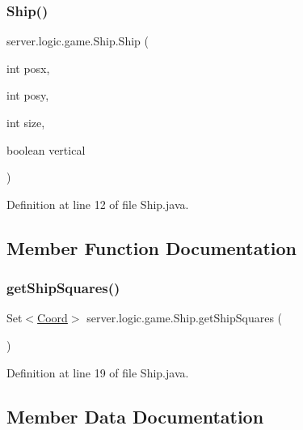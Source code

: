 \subsubsection{\texorpdfstring{Ship()}{Ship()}}
{\footnotesize\ttfamily server.\+logic.\+game.\+Ship.\+Ship (\begin{DoxyParamCaption}\item[{int}]{posx,  }\item[{int}]{posy,  }\item[{int}]{size,  }\item[{boolean}]{vertical }\end{DoxyParamCaption})}



Definition at line 12 of file Ship.\+java.



\subsection{Member Function Documentation}
\hypertarget{classserver_1_1logic_1_1game_1_1_ship_a2fd48307f52252c86d63b81456096b1e}{}\label{classserver_1_1logic_1_1game_1_1_ship_a2fd48307f52252c86d63b81456096b1e} 
\subsubsection{\texorpdfstring{get\+Ship\+Squares()}{getShipSquares()}}
{\footnotesize\ttfamily Set$<$\hyperlink{classsharedlib_1_1utils_1_1_coord}{Coord}$>$ server.\+logic.\+game.\+Ship.\+get\+Ship\+Squares (\begin{DoxyParamCaption}{ }\end{DoxyParamCaption})}



Definition at line 19 of file Ship.\+java.



\subsection{Member Data Documentation}
\hypertarget{classserver_1_1logic_1_1game_1_1_ship_a6cd98fad481d08143ecd02a2f3a03e0b}{}\label{classserver_1_1logic_1_1game_1_1_ship_a6cd98fad481d08143ecd02a2f3a03e0b} 

